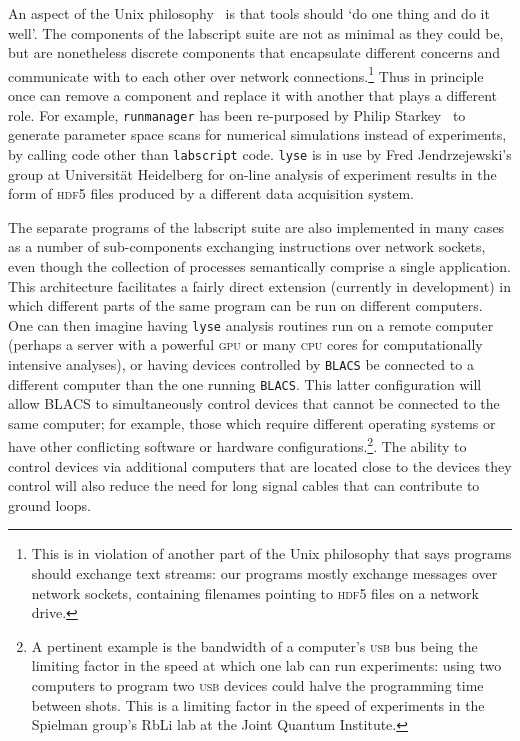 An aspect of the Unix philosophy~\cite{gancarz_unix_1995} is that tools should `do one thing and do it well'. The components of the labscript suite are not as minimal as they could be, but are nonetheless discrete components that encapsulate different concerns and communicate with to each other over network connections.\footnote{This is in violation of another part of the Unix philosophy that says programs should exchange text streams: our programs mostly exchange messages over network sockets, containing filenames pointing to \textsc{hdf5} files on a network drive.} Thus in principle once can remove a component and replace it with another that plays a different role. For example, \texttt{runmanager} has been re-purposed by Philip Starkey~\cite{starkey_thesis_2018} to generate parameter space scans for numerical simulations instead of experiments, by calling code other than \texttt{labscript} code. \texttt{lyse} is in use by Fred Jendrzejewski's group at Universit\"at Heidelberg for on-line analysis of experiment results in the form of \textsc{hdf5} files produced by a different data acquisition system.

The separate programs of the labscript suite are also implemented in many cases as a number of sub-components exchanging instructions over network sockets, even though the collection of processes semantically comprise a single application. This architecture facilitates a fairly direct extension (currently in development) in which different parts of the same program can be run on different computers. One can then imagine having \texttt{lyse} analysis routines run on a remote computer (perhaps a server with a powerful \textsc{gpu} or many \textsc{cpu} cores for computationally intensive analyses), or having devices controlled by \texttt{BLACS} be connected to a different computer than the one running \texttt{BLACS}. This latter configuration will allow BLACS to simultaneously control devices that cannot be connected to the same computer; for example, those which require different operating systems or have other conflicting software or hardware configurations.\footnote{A pertinent example is the bandwidth of a computer's \textsc{usb} bus being the limiting factor in the speed at which one lab can run experiments: using two computers to program two \textsc{usb} devices could halve the programming time between shots. This is a limiting factor in the speed of experiments in the Spielman group's RbLi lab at the Joint Quantum Institute.}. The ability to control devices via additional computers that are located close to the devices they control will also reduce the need for long signal cables that can contribute to ground loops.

